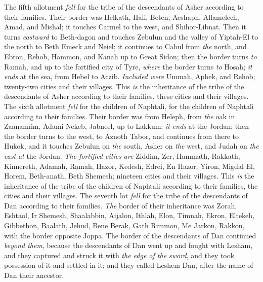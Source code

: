 \begin{biblechapter}
 The fifth allotment \textit{fell} for the tribe of the descendants of Asher according to their families.
\verse Their border was Helkath, Hali, Beten, Acshaph,
\verse Allamelech, Amad, and Mishal; it touches Carmel to the west, and Shihor-Libnat.
\verse Then it turns \textit{eastward} to Beth-dagon and touches Zebulun and the valley of Yiptah-El to the north to Beth Emeck and Neiel; it continues to Cabul from \textit{the} north,
\verse and Ebron, Rehob, Hammon, and Kanah up to Great Sidon;
\verse then the border turns \textit{to} Ramah, and up to the fortified city of Tyre, \textit{where} the border turns \textit{to} Hosah; \textit{it ends} at the sea, from Hebel to Aczib.
\verse \textit{Included were} Ummah, Aphek, and Rehob; twenty-two cities and their villages.
\verse This \textit{is} the inheritance of the tribe of the descendants of Asher according to their families, these cities and their villages.
 The sixth allotment \textit{fell} for the children of Naphtali, for the children of Naphtali according to their families.
\verse Their border was from Heleph, from \textit{the} oak in Zaanannim, Adami Nekeb, Jabneel, up to Lakkum; \textit{it ends} at the Jordan;
\verse then the border turns to the west, to Aznoth Tabor, and continues from there to Hukok, and it touches Zebulun on \textit{the} south, Asher on \textit{the} west, and Judah on \textit{the east} \textit{at} the Jordan.
\verse \textit{The fortified cities} \textit{are} Ziddim, Zer, Hammath, Rakkath, Kinnereth,
\verse Adamah, Ramah, Hazor,
\verse Kedesh, Edrei, En Hazor,
\verse Yiron, Migdal El, Horem, Beth-anath, Beth Shemesh; nineteen cities and their villages.
\verse This \textit{is} the inheritance of the tribe of the children of Naphtali according to their families, the cities and their villages.
 The seventh lot \textit{fell} for the tribe of the descendants of Dan according to their families.
\verse \textit{The} border of their inheritance was Zorah, Eshtaol, Ir Shemesh,
\verse Shaalabbin, Aijalon, Ithlah,
\verse Elon, Timnah, Ekron,
\verse Eltekeh, Gibbethon, Baalath,
\verse Jehud, Bene Berak, Gath Rimmon,
\verse Me Jarkon, Rakkon, with the border opposite Joppa.
\verse The border of the descendants of Dan continued \textit{beyond them}, because the descendants of Dan went up and fought with Lesham, and they captured and struck it with \textit{the edge of the sword}, and they took possession of it and settled in it; and they called Leshem Dan, after the name of Dan their ancestor.

\end{biblechapter}
